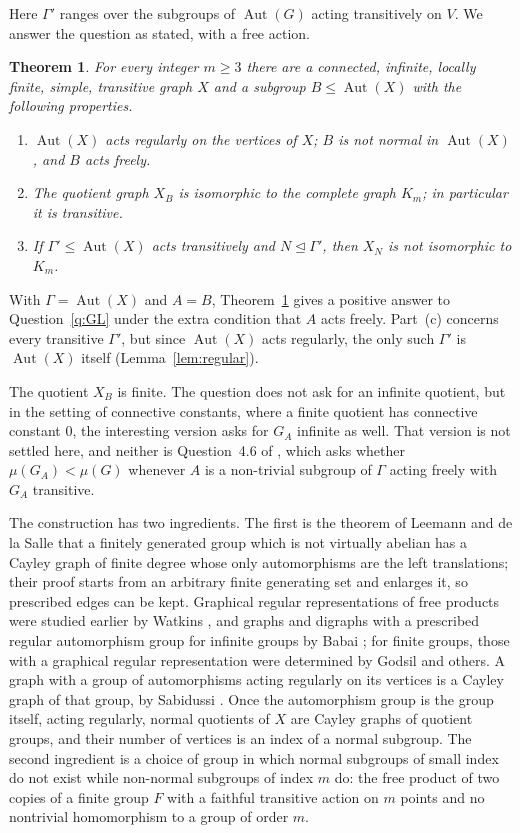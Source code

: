 \documentclass[11pt]{amsart}
\newtheorem{theorem}{Theorem}[section]
\theoremstyle{definition}
\theoremstyle{remark}
\DeclareMathOperator{\Aut}{Aut}
\begin{document}
Here $\Gamma'$ ranges over the subgroups of $\Aut(G)$ acting transitively on $V$. We answer the question as stated, with a free action.

\begin{theorem}\label{thm:main}
For every integer $m\ge3$ there are a connected, infinite, locally finite, simple, transitive graph $X$ and a subgroup $B\le\Aut(X)$ with the following properties.
\begin{enumerate}
\item $\Aut(X)$ acts regularly on the vertices of $X$; $B$ is not normal in $\Aut(X)$, and $B$ acts freely.
\item The quotient graph $X_B$ is isomorphic to the complete graph $K_m$; in particular it is transitive.
\item If $\Gamma'\le\Aut(X)$ acts transitively and $N\trianglelefteq\Gamma'$, then $X_N$ is not isomorphic to $K_m$.
\end{enumerate}
\end{theorem}

With $\Gamma=\Aut(X)$ and $A=B$, Theorem~\ref{thm:main} gives a positive answer to Question~\ref{q:GL} under the extra condition that $A$ acts freely. Part~(c) concerns every transitive $\Gamma'$, but since $\Aut(X)$ acts regularly, the only such $\Gamma'$ is $\Aut(X)$ itself (Lemma~\ref{lem:regular}).

The quotient $X_B$ is finite. The question does not ask for an infinite quotient, but in the setting of connective constants, where a finite quotient has connective constant $0$, the interesting version asks for $G_A$ infinite as well. That version is not settled here, and neither is Question~4.6 of \cite{GL}, which asks whether $\mu(G_A)<\mu(G)$ whenever $A$ is a non-trivial subgroup of $\Gamma$ acting freely with $G_A$ transitive.

The construction has two ingredients. The first is the theorem of Leemann and de la Salle \cite{LdS} that a finitely generated group which is not virtually abelian has a Cayley graph of finite degree whose only automorphisms are the left translations; their proof starts from an arbitrary finite generating set and enlarges it, so prescribed edges can be kept. Graphical regular representations of free products were studied earlier by Watkins \cite{Wat}, and graphs and digraphs with a prescribed regular automorphism group for infinite groups by Babai \cite{Bab}; for finite groups, those with a graphical regular representation were determined by Godsil \cite{God81} and others. A graph with a group of automorphisms acting regularly on its vertices is a Cayley graph of that group, by Sabidussi \cite{Sab58}. Once the automorphism group is the group itself, acting regularly, normal quotients of $X$ are Cayley graphs of quotient groups, and their number of vertices is an index of a normal subgroup. The second ingredient is a choice of group in which normal subgroups of small index do not exist while non-normal subgroups of index $m$ do: the free product of two copies of a finite group $F$ with a faithful transitive action on $m$ points and no nontrivial homomorphism to a group of order $m$.
\end{document}
